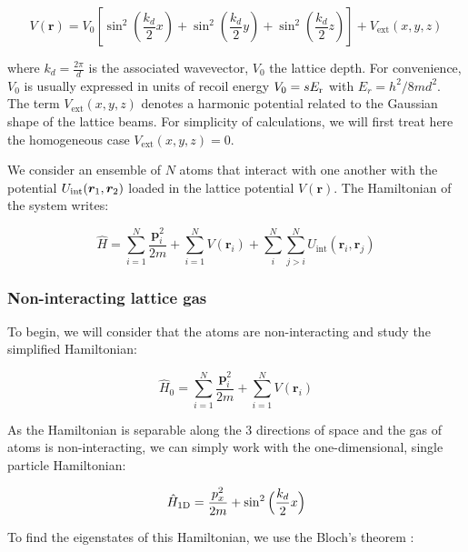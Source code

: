 \begin{equation}
    V(\bm{r})=V_{0}\left[\sin ^{2}\left(\frac{k_{d}}{2} x\right)+\sin ^{2}\left(\frac{k_{d}}{2} y\right)+\sin ^{2}\left(\frac{k_{d}}{2} z\right)\right] + V_{\mathrm{ext}} (x,y,z)
\end{equation}

\noindent where $k_d=\frac{2 \pi}{d}$ is the associated wavevector, $V_0$ the lattice depth. For convenience, $V_0$ is usually expressed in units of recoil energy $V_0 = s E_{\rm{r}}$ with $E_r=h^2/ 8 m d^2$. The term $V_{\mathrm{ext}} (x,y,z)$ denotes a harmonic potential related to the Gaussian shape of the lattice beams. For simplicity of calculations, we will first treat here the homogeneous case $V_{\mathrm{ext}} (x,y,z)=0$.

We consider an ensemble of $N$ atoms that interact with one another with the potential $U_{\rm{int}} ( \bm{r}_1, \bm{r}_2)$ loaded in the lattice potential $V(\bm{r})$. The Hamiltonian of the system writes:

\begin{equation}
    \hat{H}=\sum_{i=1}^{N} \frac{\bm{p}_{i}^{2}}{2 m}+\sum_{i=1}^{N} V\left(\bm{r}_{i}\right) + \sum_{i}^{N} \sum_{j>i}^{N} U_{\text{int}}\left(\bm{r}_{i}, \bm{r}_{j}\right)
    \label{eq:H_lattice_full}
\end{equation}

\subsubsection{Non-interacting lattice gas}

To begin, we will consider that the atoms are non-interacting and study the simplified Hamiltonian:

\begin{equation}
    \hat{H}_0=\sum_{i=1}^{N} \frac{\bm{p}_{i}^{2}}{2 m}+\sum_{i=1}^{N} V\left(\bm{r}_{i}\right)
\end{equation}

\noindent As the Hamiltonian is separable along the 3 directions of space and the gas of atoms is non-interacting, we can simply work with the one-dimensional, single particle Hamiltonian:

\begin{equation}
    \hat{H}_{\rm{1D}} = \frac{p_x^2}{2m} + \sin^2 \Big(\frac{k_d}{2} x \Big)
\end{equation}

\noindent To find the eigenstates of this Hamiltonian, we use the Bloch's theorem \cite{ashcroft1976solid}:

